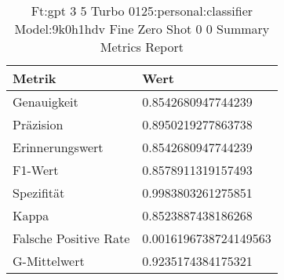 
    \begin{table}[!ht]
        \centering
        \begin{tabularx}{\textwidth}{X l}
\toprule
\textbf{Metrik} & \textbf{Wert} \\
\midrule
Genauigkeit & \num{0.8542680947744239} \\
Präzision & \num{0.8950219277863738} \\
Erinnerungswert & \num{0.8542680947744239} \\
F1-Wert & \num{0.8578911319157493} \\
Spezifität & \num{0.9983803261275851} \\
Kappa & \num{0.8523887438186268} \\
Falsche Positive Rate & \num{0.0016196738724149563} \\
G-Mittelwert & \num{0.9235174384175321} \\
\bottomrule
\end{tabularx}

        \caption{Ft:gpt 3 5 Turbo 0125:personal:classifier Model:9k0h1hdv Fine Zero Shot 0 0 Summary Metrics Report}
        \label{tab:ft:gpt-3-5-turbo-0125:personal:classifier-model:9k0H1hdV-fine-zero-shot-0-0-summary-metrics-report}
    \end{table}
    